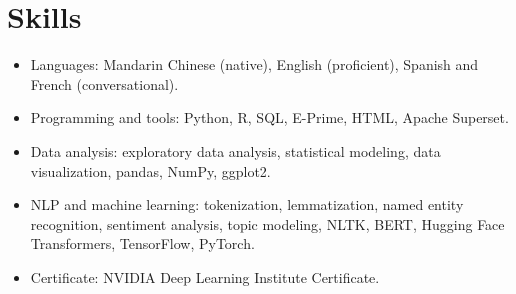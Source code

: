 \documentclass[11pt,letterpaper]{article}
\begin{document}
\section*{Skills}
\begin{itemize}
\item Languages: Mandarin Chinese (native), English (proficient), Spanish and French (conversational).
\item Programming and tools: Python, R, SQL, E-Prime, HTML, Apache Superset.
\item Data analysis: exploratory data analysis, statistical modeling, data visualization, pandas, NumPy, ggplot2.
\item NLP and machine learning: tokenization, lemmatization, named entity recognition, sentiment analysis, topic modeling, NLTK, BERT, Hugging Face Transformers, TensorFlow, PyTorch.
\item Certificate: NVIDIA Deep Learning Institute Certificate.
\end{itemize}
\end{document}

